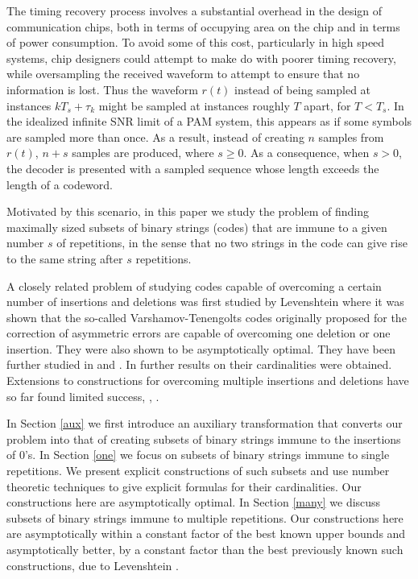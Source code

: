 \documentclass[10pt,conference]{IEEEtran}
\begin{document}
The timing recovery process involves a substantial overhead
in the design of communication chips, both in terms of occupying
area on the chip and in terms of power consumption. To
avoid some of this cost, particularly in high speed systems,
chip designers could attempt to make do with poorer
timing recovery, while oversampling the
received waveform to attempt to ensure that no
information is lost. Thus the waveform $r(t)$ instead of
being sampled at instances $kT_s+\tau_k$ might be
sampled at instances roughly $T$ apart, for $T<T_s$.
In the idealized infinite SNR limit of a PAM system,
this appears as if some symbols are sampled more than
once. As a
result, instead of creating $n$ samples from $r(t)$, $n+s$ samples
are produced, where $s \geq 0$. As a consequence, when $s>0$, the
decoder is presented with a sampled sequence whose length exceeds
the length of a codeword.

Motivated by this scenario, in this paper we study the
problem of finding maximally sized
subsets of binary strings (codes)
that are immune to a given number $s$ of repetitions, in the sense
that no two strings in the code can give rise to the same
string after $s$ repetitions.

A closely related problem of studying codes capable of overcoming a
certain number of insertions and deletions was first studied by
Levenshtein \cite{lev:66} where it was shown that the so-called
Varshamov-Tenengolts codes \cite{vt:65} originally proposed for the
correction of asymmetric errors are capable of overcoming one
deletion or one insertion. They were also shown to be asymptotically
optimal. They have been further studied in \cite{ferr:97} and
\cite{bours:94}. In \cite{sloane:00} further results on their
cardinalities were obtained. Extensions to constructions for
overcoming multiple insertions and deletions have so far found
limited success, \cite{ferr:02}, \cite{ferr:03}.

In Section \ref{aux}
we first introduce an auxiliary
transformation that converts our problem into
that of creating subsets of binary strings immune to the
insertions of $0$'s.
 In Section \ref{one} we
focus on subsets of binary strings immune to single repetitions. We
present explicit constructions of such subsets and use number
theoretic techniques to give explicit formulas for their
cardinalities. Our constructions here are asymptotically optimal. In
Section \ref{many} we discuss subsets of binary strings immune to
multiple repetitions. Our constructions here are asymptotically
within a constant factor of the best known upper bounds and
asymptotically better, by a constant factor than the best previously
known such constructions, due to Levenshtein \cite{lev:66a}.
\end{document}
